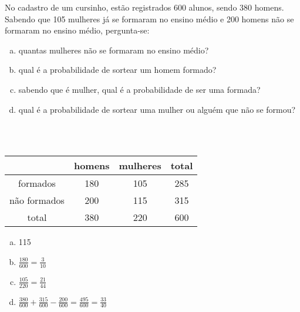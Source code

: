 \begin{ex}
No cadastro de um cursinho, estão registrados 600 alunos, sendo 380 homens. Sabendo que 105 mulheres já se formaram no ensino médio e 200 homens não se formaram no ensino médio, pergunta-se:
   \begin{enumerate}[(a)]
   \item quantas mulheres não se formaram no ensino médio?
   \item qual é a probabilidade de sortear um homem formado?
   \item sabendo que é mulher, qual é a probabilidade de ser uma  formada?
   \item qual é a probabilidade de sortear uma mulher ou alguém que não se formou?
   \end{enumerate}
     \begin{sol}
       \phantom{A} \\ \\
       \begin{tabular}{|c|c|c|c|} \hline
            & homens & mulheres &total \\  \hline 
         formados   & 180 & 105 & 285 \\ \hline
         não formados & 200 & 115 & 315 \\ \hline
         total & 380 & 220 & 600 \\ \hline
       \end{tabular}
         \begin{enumerate} [(a)]
             \item 115
             \item $\frac{180}{600}=\frac{3}{10}$
             \item $\frac{105}{220}=\frac{21}{44}$
             \item $\frac{380}{600}+\frac{315}{600}-\frac{200}{600}=\frac{495}{600}=\frac{33}{40}$
         \end{enumerate}
     \end{sol}
\end{ex}